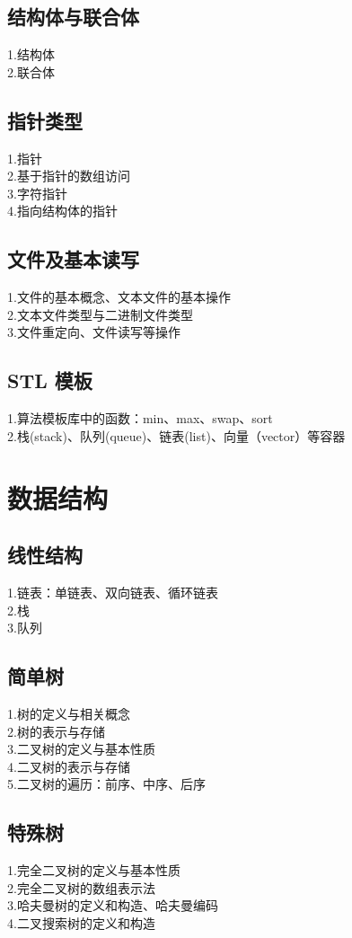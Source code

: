 \documentclass[12pt,twiside,a4paper]{ctexbook}
\numberwithin{chapter}{part}
\begin{document}
\subsection{结构体与联合体}
1.结构体\\
2.联合体

\subsection{指针类型}
1.指针\\
2.基于指针的数组访问\\
3.字符指针\\
4.指向结构体的指针

\subsection{文件及基本读写}
1.文件的基本概念、文本文件的基本操作\\
2.文本文件类型与二进制文件类型\\
3.文件重定向、文件读写等操作

\subsection{STL 模板}
1.算法模板库中的函数：min、max、swap、sort\\
2.栈(stack)、队列(queue)、链表(list)、向量（vector）等容器

\section{数据结构}
\subsection{线性结构}
1.链表：单链表、双向链表、循环链表\\
2.栈\\
3.队列
\subsection{简单树}
1.树的定义与相关概念\\
2.树的表示与存储\\
3.二叉树的定义与基本性质\\
4.二叉树的表示与存储\\
5.二叉树的遍历：前序、中序、后序

\subsection{特殊树}
1.完全二叉树的定义与基本性质\\
2.完全二叉树的数组表示法\\
3.哈夫曼树的定义和构造、哈夫曼编码\\
4.二叉搜索树的定义和构造
\end{document}
